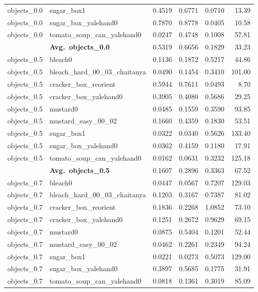 \begin{longtable}{llrrrr}
  objects_0.0 & sugar\_box1 & 0.4519 & 0.6771 & 0.0710 & 13.39 \\
  objects_0.0 & sugar\_box\_yalehand0 & 0.7870 & 0.8778 & 0.0405 & 10.58 \\
  objects_0.0 & tomato\_soup\_can\_yalehand0 & 0.0247 & 0.4748 & 0.1008 & 57.81 \\
  \cmidrule{2-6}
  & \textbf{Avg.~objects_0.0} & 0.5319 & 0.6656 & 0.1829 & 33.23 \\
  \midrule
  objects_0.5 & bleach0 & 0.1136 & 0.1872 & 0.5217 & 44.86 \\
  objects_0.5 & bleach\_hard\_00\_03\_chaitanya & 0.0490 & 0.1454 & 0.3410 & 101.00 \\
  objects_0.5 & cracker\_box\_reorient & 0.5944 & 0.7611 & 0.0493 & 8.70 \\
  objects_0.5 & cracker\_box\_yalehand0 & 0.3905 & 0.4080 & 0.5686 & 29.25 \\
  objects_0.5 & mustard0 & 0.0485 & 0.1559 & 0.3590 & 93.85 \\
  objects_0.5 & mustard\_easy\_00\_02 & 0.1660 & 0.4359 & 0.1830 & 53.51 \\
  objects_0.5 & sugar\_box1 & 0.0322 & 0.0340 & 0.5626 & 133.40 \\
  objects_0.5 & sugar\_box\_yalehand0 & 0.0362 & 0.4159 & 0.1180 & 17.91 \\
  objects_0.5 & tomato\_soup\_can\_yalehand0 & 0.0162 & 0.0631 & 0.3232 & 125.18 \\
  \cmidrule{2-6}
  & \textbf{Avg.~objects_0.5} & 0.1607 & 0.2896 & 0.3363 & 67.52 \\
  \midrule
  objects_0.7 & bleach0 & 0.0447 & 0.0567 & 0.7207 & 129.03 \\
  objects_0.7 & bleach\_hard\_00\_03\_chaitanya & 0.1203 & 0.3167 & 0.7387 & 81.02 \\
  objects_0.7 & cracker\_box\_reorient & 0.1836 & 0.2268 & 1.0852 & 73.10 \\
  objects_0.7 & cracker\_box\_yalehand0 & 0.1251 & 0.2672 & 0.9629 & 69.15 \\
  objects_0.7 & mustard0 & 0.0875 & 0.5404 & 0.1201 & 52.44 \\
  objects_0.7 & mustard\_easy\_00\_02 & 0.0462 & 0.2261 & 0.2349 & 94.24 \\
  objects_0.7 & sugar\_box1 & 0.0221 & 0.0273 & 0.5073 & 129.00 \\
  objects_0.7 & sugar\_box\_yalehand0 & 0.3897 & 0.5685 & 0.1775 & 31.91 \\
  objects_0.7 & tomato\_soup\_can\_yalehand0 & 0.0818 & 0.1361 & 0.3019 & 85.09 \\

\end{longtable}
